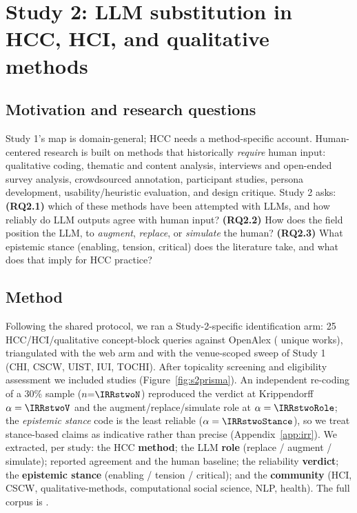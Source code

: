 \section{Study 2: LLM substitution in HCC, HCI, and qualitative methods}
\subsection{Motivation and research questions}
Study 1's map is domain-general; HCC needs a method-specific account. Human-centered research is built on methods
that historically \emph{require} human input: qualitative coding, thematic and content analysis, interviews and
open-ended survey analysis, crowdsourced annotation, participant studies, persona development, usability/heuristic
evaluation, and design critique. Study 2 asks: \textbf{(RQ2.1)} which of these methods have been attempted with
LLMs, and how reliably do LLM outputs agree with human input? \textbf{(RQ2.2)} How does the field position the
LLM, to \emph{augment}, \emph{replace}, or \emph{simulate} the human? \textbf{(RQ2.3)} What epistemic stance
(enabling, tension, critical) does the literature take, and what does that imply for HCC practice?

\subsection{Method}
Following the shared protocol, we ran a Study-2-specific identification arm: 25 HCC/HCI/qualitative concept-block
queries against OpenAlex (\SToa{} unique works), triangulated with the web arm and with the venue-scoped sweep of
Study 1 (CHI, CSCW, UIST, IUI, TOCHI). After topicality screening and eligibility assessment we included
\STN{} studies (Figure~\ref{fig:s2prisma}). An independent re-coding of a 30\% sample ($n{=}\IRRstwoN$) reproduced
the verdict at Krippendorff $\alpha=\IRRstwoV$ and the augment/replace/simulate role at $\alpha=\IRRstwoRole$; the
\emph{epistemic stance} code is the least reliable ($\alpha=\IRRstwoStance$), so we treat stance-based claims as
indicative rather than precise (Appendix~\ref{app:irr}). We extracted, per study: the HCC \textbf{method}; the LLM \textbf{role}
(replace / augment / simulate); reported agreement and the human baseline; the reliability \textbf{verdict};
the \textbf{epistemic stance} (enabling / tension / critical); and the \textbf{community} (HCI, CSCW,
qualitative-methods, computational social science, NLP, health). The full corpus is \sttwotabref.

